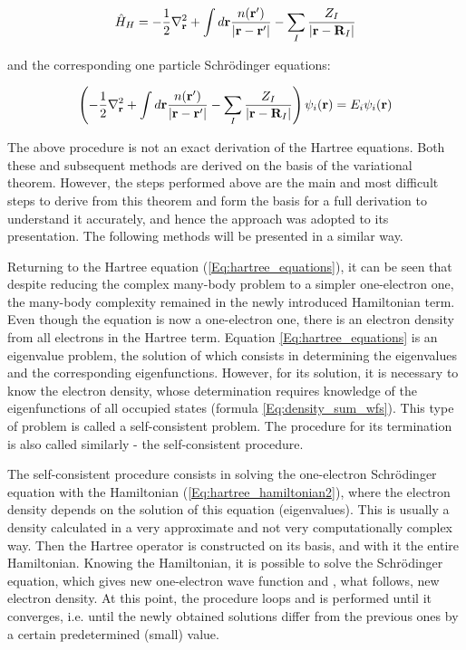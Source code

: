 \begin{equation}
    \label{Eq:hartree_hamiltonian2}
    \begin{aligned}
        \hat{H}_H=-\frac{1}{2}\nabla^2_{\mathbf{r}}+\int d\mathbf{r}\frac{n(\mathbf{r}')}{\left|\mathbf{r}-\mathbf{r'}\right|}-\sum_I\frac{Z_I}{|\mathbf{r}-\mathbf{R}_I|}
    \end{aligned}
\end{equation}

and the corresponding one particle Schr\"odinger equations:

\begin{equation}
    \label{Eq:hartree_equations}
    \left(-\frac{1}{2}\nabla^2_{\mathbf{r}}+\int d\mathbf{r}\frac{n(\mathbf{r}')}{\left|\mathbf{r}-\mathbf{r'}\right|}-\sum_I\frac{Z_I}{|\mathbf{r}-\mathbf{R}_I|}\right)\psi_i(\mathbf{r})=E_i\psi_i(\mathbf{r})
\end{equation}

The above procedure is not an exact derivation of the Hartree equations.
Both these and subsequent methods are derived on the basis of the variational theorem.
However, the steps performed above are the main and most difficult steps to derive from this theorem and form the basis for a full derivation to understand it accurately, and hence the approach was adopted to its presentation.
The following methods will be presented in a similar way.

Returning to the Hartree equation (\ref{Eq:hartree_equations}), it can be seen that despite reducing the complex many-body problem to a simpler one-electron one, the many-body complexity remained in the newly introduced Hamiltonian term.
Even though the equation is now a one-electron one, there is an electron density from all electrons in the Hartree term.
Equation \ref{Eq:hartree_equations} is an eigenvalue problem, the solution of which consists in determining the eigenvalues and the corresponding eigenfunctions.
However, for its solution, it is necessary to know the electron density, whose determination requires knowledge of the eigenfunctions of all occupied states (formula \ref{Eq:density_sum_wfs}).
This type of problem is called a self-consistent problem.
The procedure for its termination is also called similarly - the self-consistent procedure.

The self-consistent procedure consists in solving the one-electron Schr\"odinger equation with the Hamiltonian (\ref{Eq:hartree_hamiltonian2}), where the electron density depends on the solution of this equation (eigenvalues).
This is usually a density calculated in a very approximate and not very computationally complex way.
Then the Hartree operator is constructed on its basis, and with it the entire Hamiltonian.
Knowing the Hamiltonian, it is possible to solve the Schr\"odinger equation, which gives new one-electron wave function and , what follows, new electron density.
At this point, the procedure loops and is performed until it converges, i.e. until the newly obtained solutions differ from the previous ones by a certain predetermined (small) value.

